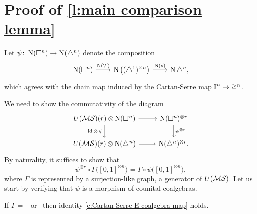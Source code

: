 
\section{Proof of \cref{l:main comparison lemma}} \label{s:comparison proof}

Let $\psi \colon \operatorname{N}(\square^n) \to \operatorname{N}(\triangle^n)$ denote the composition
\begin{equation*}
\begin{tikzcd}[column sep=normal]
\chains(\cube^n) \arrow[r, "\chains(\T)"] &[-3pt]
\chains \big( \scube{n} \big) \arrow[r, "\chains(s)"] &[-3pt]
\chains \simplex^n,
\end{tikzcd}
\end{equation*}
which agrees with the chain map induced by the Cartan-Serre map $\bm{\mathbb{I}}^n \to \mathbb{\Delta}^n$.

We need to show the commutativity of the diagram
\begin{equation*}
\begin{tikzcd}
U(\MS)(r) \otimes \chains(\cube^n) \arrow[r] \arrow[d, "\id\, \otimes\, \psi"'] &
\cchains(\cube^n)^{\otimes r} \arrow[d, "\psi^{\otimes r}"] \\
U(\MS)(r) \otimes \cchains(\simplex^n) \arrow[r] &
\cchains(\simplex^n)^{\otimes r}.
\end{tikzcd}
\end{equation*}
By naturality, it suffices to show that
\begin{equation} \label{e:Cartan-Serre E-coalgebra map}
\psi^{\otimes r} \circ \Gamma\big( [0,1]^{\otimes n} \big) = \Gamma \circ \psi \big( [0,1]^{\otimes n} \big),
\end{equation}
where $\Gamma$ is represented by a surjection-like graph, a generator of $U(\mathcal{MS})$.
Let us start by verifying that $\psi$ is a morphism of counital coalgebras.

\begin{lemma}
	If $\Gamma =$ \counit \ or \coproduct \ then identity \eqref{e:Cartan-Serre E-coalgebra map} holds.
\end{lemma}

